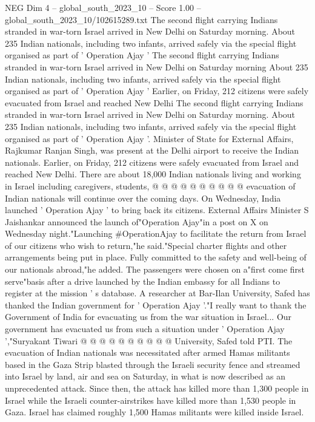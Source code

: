 \begin{textsample}{NEG Dim 4 – global\_south\_2023\_10 – Score 1.00 – global\_south\_2023\_10/102615289.txt}  \label{ex:f4_neg_025}
The second flight carrying Indians stranded in war-torn Israel arrived in New Delhi on Saturday morning.
About 235 Indian nationals, including two infants, arrived safely via the special flight organised as part of ' Operation Ajay ' The second flight carrying Indians stranded in war-torn Israel arrived in New Delhi on Saturday morning About 235 Indian nationals, including two infants, arrived safely via the special flight organised as part of ' Operation Ajay ' Earlier, on Friday, 212 citizens were safely evacuated from Israel and reached New Delhi The second flight carrying Indians stranded in war-torn Israel arrived in New Delhi on Saturday morning.
About 235 Indian nationals, including two infants, arrived safely via the special flight organised as part of ' Operation Ajay '.
Minister of State for External Affairs, Rajkumar Ranjan Singh, was present at the Delhi airport to receive the Indian nationals.
Earlier, on Friday, 212 citizens were safely evacuated from Israel and reached New Delhi.
There are about 18,000 Indian nationals living and working in Israel including caregivers, students, @ @ @ @ @ @ @ @ @ @ evacuation of Indian nationals will continue over the coming days.
On Wednesday, India launched ' Operation Ajay ' to bring back its citizens.
External Affairs Minister S Jaishankar announced the launch of"Operation Ajay"in a post on X on Wednesday night."Launching \#OperationAjay to facilitate the return from Israel of our citizens who wish to return,"he said."Special charter flights and other arrangements being put in place.
Fully committed to the safety and well-being of our nationals abroad,"he added.
The passengers were chosen on a"first come first serve"basis after a drive launched by the Indian embassy for all Indians to register at the mission ' s database.
A researcher at Bar-Ilan University, Safed has thanked the Indian government for ' Operation Ajay '."I really want to thank the Government of India for evacuating us from the war situation in Israel...
Our government has evacuated us from such a situation under ' Operation Ajay ',"Suryakant Tiwari @ @ @ @ @ @ @ @ @ @ University, Safed told PTI.
The evacuation of Indian nationals was necessitated after armed Hamas militants based in the Gaza Strip blasted through the Israeli security fence and streamed into Israel by land, air and sea on Saturday, in what is now described as an unprecedented attack.
Since then, the attack has killed more than 1,300 people in Israel while the Israeli counter-airstrikes have killed more than 1,530 people in Gaza.
Israel has claimed roughly 1,500 Hamas militants were killed inside Israel.

\end{textsample}
